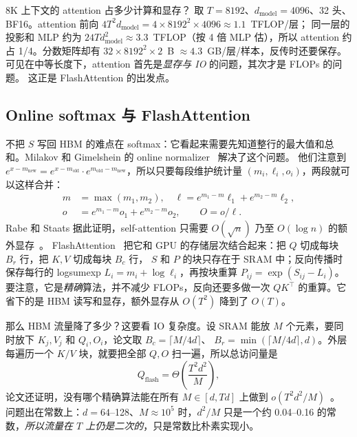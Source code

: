 \begin{est}{8K 上下文的 attention 占多少计算和显存？}
取 $T=8192$、$d_{\text{model}}=4096$、32 头、BF16。attention 前向 $4T^2d_{\text{model}}=4\times8192^2\times4096\approx1.1$~TFLOP/层；
同一层的投影和 MLP 约为 $24Td_{\text{model}}^2\approx3.3$~TFLOP（按 4 倍 MLP 估），所以 attention 约占 1/4。分数矩阵却有 $32\times8192^2\times2$~B
$\approx4.3$~GB/层/样本，反传时还要保存。可见在中等长度下，attention 首先是\emph{显存与 IO} 的问题，其次才是 FLOPs 的问题。
这正是 FlashAttention 的出发点。
\end{est}

\subsection{Online softmax 与 FlashAttention}

不把 $S$ 写回 HBM 的难点在 softmax：它看起来需要先知道整行的最大值和总和。Milakov 和 Gimelshein 的 online normalizer~\cite{milakov2018online} 解决了这个问题。
他们注意到 $e^{x-m_{\text{new}}}=e^{x-m_{\text{old}}}\cdot e^{m_{\text{old}}-m_{\text{new}}}$，所以只要每段维护统计量 $(m_i,\ell_i,o_i)$，两段就可以这样合并：
\begin{equation}
\begin{aligned}
m &= \max(m_1,m_2),\quad
\ell = e^{m_1-m}\ell_1 + e^{m_2-m}\ell_2,\\
o &= e^{m_1-m}o_1 + e^{m_2-m}o_2,\qquad O=o/\ell .
\end{aligned}
\label{eq:online}
\end{equation}
Rabe 和 Staats 据此证明，self-attention 只需要 $O(\sqrt{n})$ 乃至 $O(\log n)$ 的额外显存~\cite{rabe2021selfattention}。
FlashAttention~\cite{dao2022flashattention} 把它和 GPU 的存储层次结合起来：把 $Q$ 切成每块 $B_r$ 行，把 $K,V$ 切成每块 $B_c$ 行，
$S$ 和 $P$ 的块只存在于 SRAM 中；反向传播时保存每行的 logsumexp $L_i=m_i+\log\ell_i$，再按块重算 $P_{ij}=\exp(S_{ij}-L_i)$。
要注意，它是\emph{精确}算法，并不减少 FLOPs，反向还要多做一次 $QK^\top$ 的重算。它省下的是 HBM 读写和显存，额外显存从 $O(T^2)$ 降到了 $O(T)$。

那么 HBM 流量降了多少？这要看 IO 复杂度。设 SRAM 能放 $M$ 个元素，要同时放下 $K_j,V_j$ 和 $Q_i,O_i$，论文取 $B_c=\lceil M/4d\rceil$、
$B_r=\min(\lceil M/4d\rceil,d)$。外层每遍历一个 $K/V$ 块，就要把全部 $Q,O$ 扫一遍，所以总访问量是
\begin{equation}
Q_{\text{flash}} = \Theta\!\left(\frac{T^2d^2}{M}\right),
\end{equation}
论文还证明，没有哪个精确算法能在所有 $M\in[d,Td]$ 上做到 $o(T^2d^2/M)$~\cite{dao2022flashattention}。
问题出在常数上：$d=64$--128、$M\approx10^5$ 时，$d^2/M$ 只是一个约 0.04--0.16 的常数，\emph{所以流量在 $T$ 上仍是二次的}，只是常数比朴素实现小。

